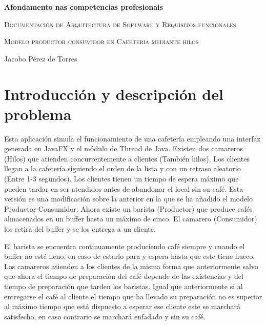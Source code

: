 \documentclass[a4paper,12pt]{article}
\begin{document}
    \begin{titlepage}
    \centering
    {\bfseries\LARGE Afondamento nas competencias profesionais\par}
    \vspace{2cm}
    {\scshape\Huge Documentación de Arquitectura de Software y Requisitos funcionales\par}
    \vspace{1cm}
    {\scshape\Large Modelo productor consumidor en Cafeteria mediante hilos\par}
    \vspace{5cm}
    \vfill
    {\Large Jacobo Pérez de Torres\par}
    \vfill
    \end{titlepage}

    \tableofcontents
    \newpage

    \section{Introducción y descripción del problema}
    Esta aplicación simula el funcionamiento de una cafetería empleando una interfaz generada en JavaFX y el módulo de
    Thread de Java. Existen dos camareros (Hilos) que atienden concurrentemente a clientes (También hilos). Los clientes
    llegan a la cafetería siguiendo el orden de la lista y con un retraso aleatorio (Entre 1-3 segundos).
    Los clientes tienen un tiempo de espera máximo que pueden tardar en ser atendidos antes de abandonar el local sin su
    café.
    Esta versión es una modificación sobre la anterior en la que se ha añadido el modelo Productor-Consumidor. Ahora existe un
    barista (Productor) que produce cafés almacenados en un buffer hasta un máximo de cinco. El camarero (Consumidor) los retira
    del buffer y se los entrega a un cliente.

    \vspace{0.5cm}
    \noindent El barista se encuentra continuamente produciendo café siempre y cuando el buffer no esté lleno, en caso de estarlo para y espera hasta que
    este tiene hueco. Los camareros atienden a los clientes de la misma forma que anteriormente salvo que ahora el tiempo de preparación del café depende
    de las existencias y del tiempo de preparación que tarden los baristas.
    Igual que anteriormente si al entregarse el café al cliente el tiempo que ha llevado su preparación no es superior al máximo tiempo que está dispuesto a
    esperar ese cliente este se marchará satisfecho, en caso contrario se marchará enfadado y sin su café.
\end{document}
